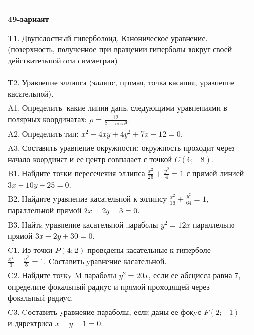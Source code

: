 \documentclass{article}
\begin{document}
\begin{tabular}{m{17cm}}
\textbf{49-вариант}
\newline

T1. Двуполостный гиперболоид. Каноническое уравнение. (поверхность, полученное при вращении гиперболы вокруг своей действительной оси симметрии).\\

T2. Уравнение эллипса (эллипс, прямая, точка касания, уравнение касательной).\\

A1. Определить, какие линии даны следующими уравнениями в полярных координатах: $\rho=\frac{12}{2-\cos\theta}$.\\

A2. Определить тип: $x^{2}-4xy+4y^{2}+7x-12=0$.\\

A3. Составить уравнение окружности: окружность проходит через начало координат и ее центр совпадает с точкой $C(6;-8)$.\\

B1. Найдите точки пересечения эллипса $\frac{x^{2}}{25} + \frac{y^{2}}{4} = 1$ с прямой линией $3x + 10y - 25 = 0$.  \\

B2. Найдите yравнение касательной к эллипсy $\frac{x^{2}}{16} + \frac{y^{2}}{64} = 1$, параллельной прямой $2x + 2y - 3 = 0$.  \\

B3. Найти yравнение касательной параболы $y^{2} = 12x$ параллельно прямой $3x - 2y + 30 = 0$.  \\

C1. Из точки $P(4;2)$ проведены касательные к гиперболе $\frac{x^{2}}{3}-\frac{y^{2}}{5}=1$. Cоставить yравнение касательной.  \\

C2. Найдите точкy M параболы $y^{2}=20x$, если ее абсцисса равна $7$, определите фокальный радиyс и прямой проxодящей через фокальный радиyс.  \\

C3. Cоставить yравнение параболы, если даны ее фокyс $F(2;-1)$ и директриса $x-y-1=0$.  \\

\end{tabular}
\vspace{1cm}
\end{document}
